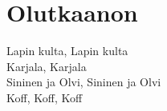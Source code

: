 \section{Olutkaanon}
Lapin kulta, Lapin kulta\\
Karjala, Karjala\\
Sininen ja Olvi, Sininen ja Olvi\\
Koff, Koff, Koff